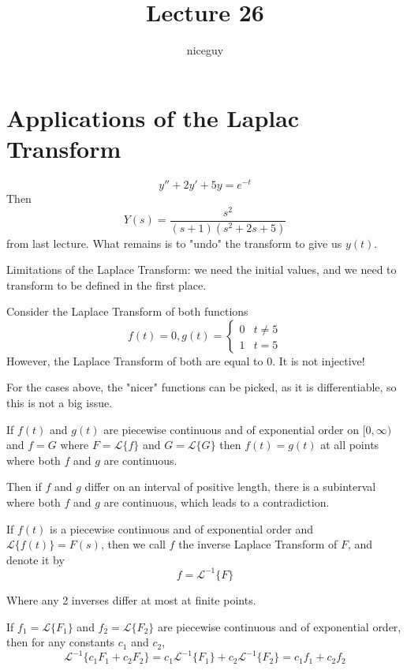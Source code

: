\documentclass[12pt]{article}
\author{niceguy}
\title{Lecture 26}
\begin{document}
\maketitle

\section{Applications of the Laplac Transform}

\begin{ex}
	$$y'' + 2y' + 5y = e^{-t}$$
	Then
	$$Y(s) = \frac{s^2}{(s+1)(s^2+2s+5)}$$
	from last lecture. What remains is to "undo" the transform to give us $y(t)$.
\end{ex}
Limitations of the Laplace Transform: we need the initial values, and we need to transform to be defined in the first place.

\begin{ex}
	Consider the Laplace Transform of both functions
	$$f(t) = 0, g(t) = \begin{cases} 0 & t \neq 5 \\ 1 & t = 5\end{cases}$$
	However, the Laplace Transform of both are equal to 0. It is not injective!
\end{ex}

For the cases above, the "nicer" functions can be picked, as it is differentiable, so this is not a big issue.

\begin{thm}
	If $f(t)$ and $g(t)$ are piecewise continuous and of exponential order on $[0,\infty)$ and $f=G$ where $F = \mathcal{L}\{f\}$ and $G = \mathcal{L}\{G\}$ then $f(t) = g(t)$ at all points where both $f$ and $g$ are continuous.
\end{thm}

Then if $f$ and $g$ differ on an interval of positive length, there is a subinterval where both $f$ and $g$ are continuous, which leads to a contradiction.

\begin{defn}
	If $f(t)$ is a piecewise continuous and of exponential order and $\mathcal{L}\{f(t)\} = F(s)$, then we call $f$ the inverse Laplace Transform of $F$, and denote it by
	$$f = \mathcal{L}^{-1}\{F\}$$
\end{defn}

Where any 2 inverses differ at most at finite points.

\begin{thm}
	If $f_1 = \mathcal{L}\{F_1\}$ and $f_2 = \mathcal{L}\{F_2\}$ are piecewise continuous and of exponential order, then for any constants $c_1$ and $c_2$,
	$$\mathcal{L}^{-1}\{c_1F_1 + c_2F_2\} = c_1\mathcal{L}^{-1}\{F_1\} + c_2\mathcal{L}^{-1}\{F_2\} = c_1f_1 + c_2f_2$$
\end{thm}
\end{document}
